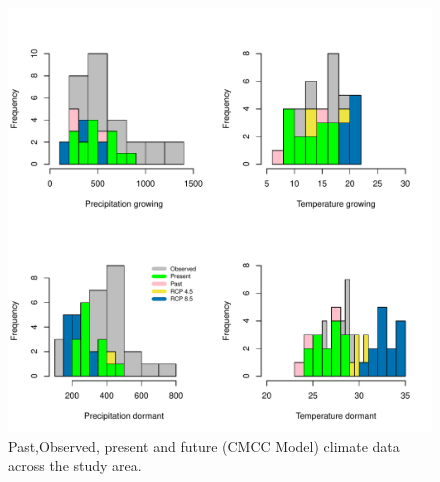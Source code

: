 \documentclass[12pt]{article}
\begin{document}
\begin{figure}[H]
		\centering
		\includegraphics[width=0.99\linewidth]{Figures/CMCC.pdf}
		\caption{Past,Observed, present and future (CMCC Model) climate data across the study area.}
		\label{Sup:projectionCMCC}
\end{figure}
\end{document}
